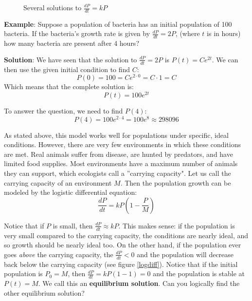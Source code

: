 \begin{figure}
\centering
    \caption{Several solutions to $\frac{dP}{dt} = kP$}
    \label{expdiff}
\end{figure}


\textbf{Example}: Suppose a population of bacteria has an initial population 
of 100 bacteria. If the bacteria's growth rate is given by $\frac{dP}{dt} = 
2P$, (where $t$ is in hours) how many bacteria are present after 4 hours?

\textbf{Solution}: We have seen that the solution to $\frac{dP}{dt} = 2P$ is 
$P(t) = Ce^{2t}$. We can then use the given initial condition to find $C$:
$$P(0) = 100 = Ce^{2 \cdot 0} = C \cdot 1 = C$$
Which means that the complete solution is:
$$P(t) = 100 e^{2t}$$

To answer the question, we need to find $P(4)$:
$$P(4) = 100 e^{2 \cdot 4} = 100 e^{8} \approx 298096$$

As stated above, this model works well for populations under specific, ideal 
conditions. However, there are very few environments in which these conditions 
are met. Real animals suffer from disease, are hunted by predators, and have 
limited food supplies. Most environments have a maximum number of animals they 
can support, which ecologists call a ''carrying capacity". Let us call the 
carrying capacity of an environment $M$. Then the population growth can be 
modeled by the logistic differential equation: 
$$\frac{dP}{dt} = kP \left( 1 - \frac{P}{M} \right)$$

Notice that if $P$ is small, then $\frac{dP}{dt} \approx kP$. This makes 
sense: if the population is very small compared to the carrying capacity, 
the conditions are nearly ideal, and so growth should be nearly ideal too. 
On the other hand, if the population ever goes \textit{above} the carrying 
capacity, the $\frac{dP}{dt} < 0$ and the population will decrease back 
below the carrying capacity (see figure \ref{logdiff}). Notice that if the 
initial population is $P_0 = M$, then $\frac{dP}{dt} = kP \left( 1 - 1 \right) 
= 0$ and the population is stable at $P(t) = M$. We call this an 
\textbf{equilibrium solution}. Can you logically find the other equilibrium 
solution? 

